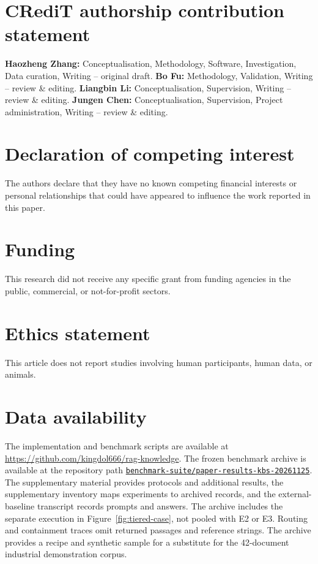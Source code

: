 
\section*{CRediT authorship contribution statement}
\textbf{Haozheng Zhang:} Conceptualisation, Methodology, Software,
Investigation, Data curation, Writing -- original draft.
\textbf{Bo Fu:} Methodology, Validation, Writing -- review \& editing.
\textbf{Liangbin Li:} Conceptualisation, Supervision, Writing -- review \& editing.
\textbf{Jungen Chen:} Conceptualisation, Supervision, Project administration,
Writing -- review \& editing.

\section*{Declaration of competing interest}
The authors declare that they have no known competing financial interests
or personal relationships that could have appeared to influence the work
reported in this paper.

\section*{Funding}
This research did not receive any specific grant from funding agencies in
the public, commercial, or not-for-profit sectors.

\section*{Ethics statement}
This article does not report studies involving human participants, human
data, or animals.

\section*{Data availability}
The implementation and benchmark scripts are available at
\url{https://github.com/kingdol666/rag-knowledge}. The frozen benchmark
archive is available at the repository path
\href{https://github.com/kingdol666/rag-knowledge/tree/092e8bf2d65859dcd684071ed4169a40fbbc1563/benchmark-suite/paper-results-kbs-20261125}{\nolinkurl{benchmark-suite/paper-results-kbs-20261125}}.
The supplementary material provides protocols and additional results, the
supplementary inventory maps experiments to archived records, and the
external-baseline transcript records prompts and answers. The archive includes
the separate execution in Figure~\ref{fig:tiered-case}, not pooled with E2 or E3.
Routing and containment traces omit returned passages and reference strings.
The archive provides a recipe and synthetic sample for a substitute for the
42-document industrial demonstration corpus.


